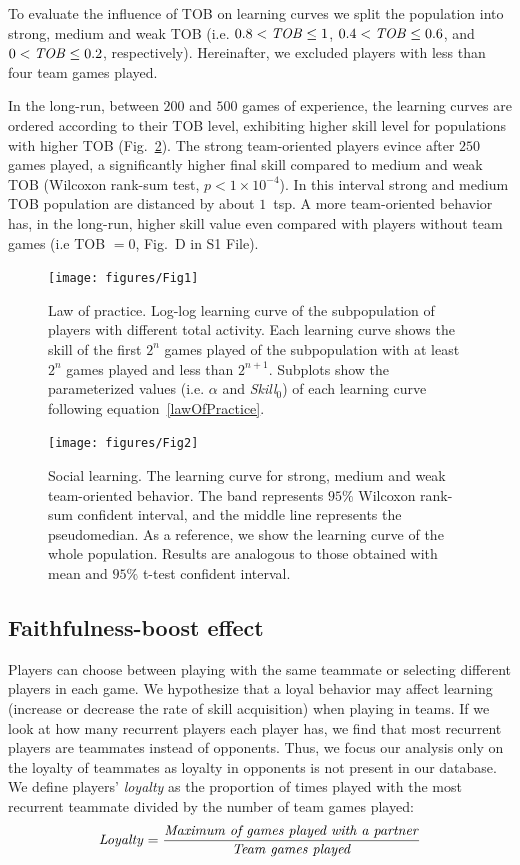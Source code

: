 \documentclass[a4paper,10pt]{book}
\theoremstyle{definition}
\begin{document}
To evaluate the influence of TOB on learning curves we split the population into strong, medium and weak TOB (i.e. $0.8<\text{\emph{TOB}}\leq 1$, $0.4 <\text{\emph{TOB}}\leq 0.6$, and $0 <\text{\emph{TOB}}\leq 0.2$, respectively). 
Hereinafter, we excluded players with less than four team games played.

In the long-run, between $200$ and $500$ games of experience, the learning curves are ordered according to their TOB level, exhibiting higher skill level for populations with higher TOB (Fig.~\ref{learningskill_team_hasta4team}).
The strong team-oriented players evince after $250$ games played, a significantly higher final skill compared to medium and weak TOB (Wilcoxon rank-sum test, $p<1 \times10^{-4}$).
In this interval strong and medium TOB population are distanced by about $1$~tsp.
A more team-oriented behavior has, in the long-run, higher skill value even compared with players without team games (i.e TOB $= 0$, Fig.~D in S1 File).

\begin{figure}[ht!]
\centering
\texttt{[image: figures/Fig1]}
\caption{Law of practice. Log-log learning curve of the subpopulation of players with different total activity. Each learning curve shows the skill of the first $2^n$ games played of the subpopulation with at least $2^n$ games played and less than $2^{n+1}$. Subplots show the parameterized values (i.e. $\alpha$ and \emph{Skill}$_0$) of each learning curve following equation~\ref{lawOfPractice}.}
\label{learningskill_curve}
\end{figure}

\begin{figure}[ht!]
\centering
\texttt{[image: figures/Fig2]}
\caption{Social learning. The learning curve for strong, medium and weak team-oriented behavior. The band represents $95\%$ Wilcoxon rank-sum confident interval, and the middle line represents the pseudomedian. As a reference, we show the learning curve of the whole population. Results are analogous to those obtained with mean and $95\%$ t-test confident interval.}
\label{learningskill_team_hasta4team}
\end{figure}


\subsection{Faithfulness-boost effect}

Players can choose between playing with the same teammate or selecting different players in each game.
We hypothesize that a loyal behavior may affect learning (increase or decrease the rate of skill acquisition) when playing in teams.
If we look at how many recurrent players each player has, we find that most recurrent players are teammates instead of opponents.
Thus, we focus our analysis only on the loyalty of teammates as loyalty in opponents is not present in our database.
We define players' \emph{loyalty} as the proportion of times played with the most recurrent teammate divided by the number of team games played:
\begin{equation}
\text{\emph{Loyalty}} = \frac{\text{\emph{Maximum of games played with a partner}}}{\text{\emph{Team games played}}}
\end{equation}
\end{document}
